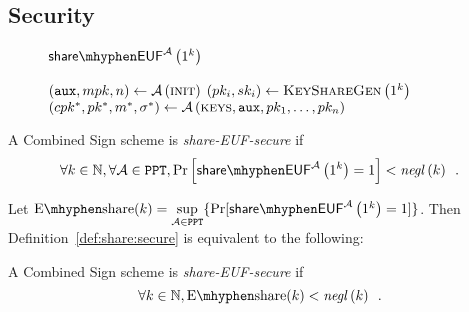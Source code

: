   \subsection{Security}
    \begin{figure}[H]
      \begin{gamebox}{$\mathsf{share \mhyphen
      EUF}^{\adversary}\left(1^k\right)$}
        \begin{algorithmic}[1]
          \State $\left(\mathtt{aux}, mpk, n\right) \gets
          \mathcal{A}\left(\textsc{init}\right)$
            \State $\left(pk_i, sk_i\right) \gets
            \textsc{KeyShareGen}\left(1^k\right)$
          \EndFor
          \State $\left(cpk^*, pk^*, m^*, \sigma^*\right) \gets
          \mathcal{A}\left(\textsc{keys}, \mathtt{aux}, pk_1, \dots, pk_n\right)$
            \State {}
          \Else
            \State {}
          \EndIf
        \end{algorithmic}
      \end{gamebox}
      \caption{}
      \label{game:comb:share}
    \end{figure}
    \begin{definition}
      \label{def:share:secure}
      A Combined Sign scheme is \emph{\textsf{share-EUF}-secure} if
      \begin{equation*}
        \forall k \in \mathbb{N}, \forall \adversary \in \mathtt{PPT},
        \Pr\left[\mathsf{share \mhyphen EUF}^{\adversary}\left(1^k\right) =
        1\right] < \mathit{negl}\left(k\right) \enspace.
      \end{equation*}
    \end{definition}

    Let $\mathrm{E \mhyphen share}(k) = \underset{\adversary \in
    \mathtt{PPT}}{\sup}\{\Pr[\mathsf{share \mhyphen
    EUF}^{\adversary}\left(1^k\right) = 1]\}$. Then
    Definition~\ref{def:share:secure} is equivalent to the following:

    \begin{definition}
      \label{def:share:secure:sup}
      A Combined Sign scheme is \emph{\textsf{share-EUF}-secure} if
      \begin{equation*}
        \forall k \in \mathbb{N}, \mathrm{E \mhyphen share}(k) <
        \mathit{negl}\left(k\right) \enspace.
      \end{equation*}
    \end{definition}

